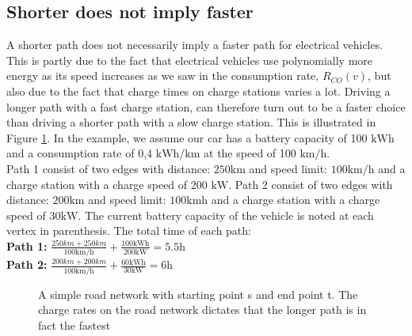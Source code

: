 \subsection{Shorter does not imply faster}
\label{sec:shorternotfaster}

A shorter path does not necessarily imply a faster path for electrical vehicles. This is partly due to the fact that electrical vehicles use polynomially more energy as its speed increases as we saw in the consumption rate, $R_{CO}(v)$, but also due to the fact that charge times on charge stations varies a lot. Driving a longer path with a fast charge station, can therefore turn out to be a faster choice than driving a shorter path with a slow charge station. This is illustrated in Figure \ref{fig:simpleroad-network}. In the example, we assume our car has a battery capacity of 100 $\si{\kWh}$ and a consumption rate of 0,4 $\si{\kWh\per\km}$ at the speed of 100 $\si{\km\per\hour}$.\\

Path 1 consist of two edges with distance: $ 250 \si{\km}$ and speed limit: $100 \si{\km\per\hour}$
and a charge station with a charge speed of 200 $\si{\kW}$. Path 2 consist of two edges with distance: $200 \si{\km}$ and speed limit: $100 \si{\km\hour}$ and a charge station with a charge speed of $30\si{\kW}$. The current battery capacity of the vehicle is noted at each vertex in parenthesis. The total time of each path:\\
				
\textbf{Path 1:} $\frac{250\si{km} + 250\si{km}}{100\si{\km\per\hour}} + \frac{100\si{\kWh}}{200\si{\kW}} = 5.5\si{\hour}$\\

\textbf{Path 2:} $\frac{200\si{km} + 200\si{km}}{100 \si{\km\per\hour}} + \frac{60\si{\kWh}}{30\si{\kW}} = 6\si{\hour}$

\begin{figure}
\label{fig:simpleroad-network}
\caption{A simple road network with starting point s and end point t. The charge rates on the road network dictates that the longer path is in fact the fastest}
\end{figure}
